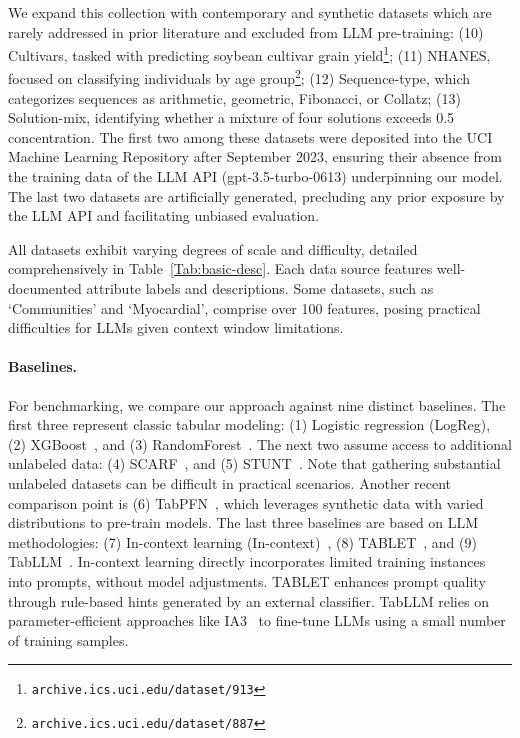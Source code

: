 We expand this collection with contemporary and synthetic datasets which are rarely addressed in prior literature and excluded from LLM pre-training: (10) Cultivars, tasked with predicting soybean cultivar grain yield\footnote{\texttt{archive.ics.uci.edu/dataset/913}}; (11) NHANES, focused on classifying individuals by age group\footnote{\texttt{archive.ics.uci.edu/dataset/887}}; (12) Sequence-type, which categorizes sequences as arithmetic, geometric, Fibonacci, or Collatz; (13) Solution-mix, identifying whether a mixture of four solutions exceeds 0.5 concentration. The first two among these datasets were deposited into the UCI Machine Learning Repository after September 2023, ensuring their absence from the training data of the LLM API (gpt-3.5-turbo-0613) underpinning our model. The last two datasets are artificially generated, precluding any prior exposure by the LLM API and facilitating unbiased evaluation.

All datasets exhibit varying degrees of scale and difficulty, detailed comprehensively in Table~\ref{Tab:basic-desc}.
Each data source features well-documented attribute labels and descriptions. Some datasets, such as `Communities' and `Myocardial', comprise over 100 features, posing practical difficulties for LLMs given context window limitations. 

\vspace*{-0.12in}
\paragraph{Baselines.}
For benchmarking, we compare our approach against nine distinct baselines. The first three represent classic tabular modeling: (1) Logistic regression (LogReg), (2) XGBoost~\cite{chen2016xgboost}, and (3) RandomForest~\cite{ho1995random}. The next two assume access to additional unlabeled data: (4) SCARF~\cite{bahri2022scarf}, and (5) STUNT~\cite{nam2023stunt}. Note that gathering substantial unlabeled datasets can be difficult in practical scenarios. Another recent comparison point is (6) TabPFN~\cite{hollmann2022tabpfn}, which leverages synthetic data with varied distributions to pre-train models. The last three baselines are based on LLM methodologies: (7) In-context learning (In-context)~\cite{wei2022emergent}, (8) TABLET~\cite{slack2023tablet}, and (9) TabLLM~\cite{hegselmann2023tabllm}. In-context learning directly incorporates limited training instances into prompts, without model adjustments. TABLET enhances prompt quality through rule-based hints generated by an external classifier. TabLLM relies on parameter-efficient approaches like IA3~\cite{liu2022few} to fine-tune LLMs using a small number of training samples.


